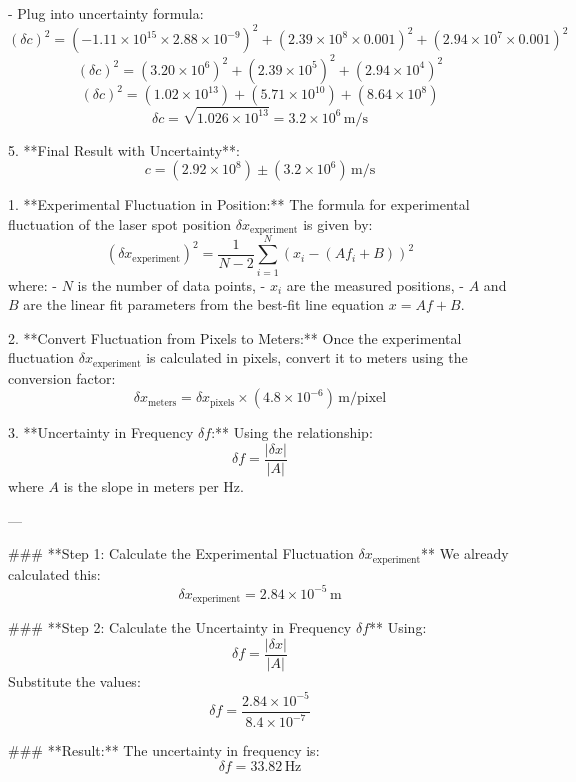      - Plug into uncertainty formula:
       \[
       (\delta c)^2 = \left( -1.11 \times 10^{15} \times 2.88 \times 10^{-9} \right)^2 + \left( 2.39 \times 10^{8} \times 0.001 \right)^2 + \left( 2.94 \times 10^{7} \times 0.001 \right)^2
       \]
       \[
       (\delta c)^2 = (3.20 \times 10^{6})^2 + (2.39 \times 10^{5})^2 + (2.94 \times 10^{4})^2
       \]
       \[
       (\delta c)^2 = (1.02 \times 10^{13}) + (5.71 \times 10^{10}) + (8.64 \times 10^{8})
       \]
       \[
       \delta c = \sqrt{1.026 \times 10^{13}} = 3.2 \times 10^{6} \, \text{m/s}
       \]

5. **Final Result with Uncertainty**:
   \[
   c = (2.92 \times 10^{8}) \pm (3.2 \times 10^{6}) \, \text{m/s}
   \]


1. **Experimental Fluctuation in Position:**
   The formula for experimental fluctuation of the laser spot position \( \delta x_{\text{experiment}} \) is given by:
   \[
   (\delta x_{\text{experiment}})^2 = \frac{1}{N - 2} \sum_{i=1}^{N} (x_i - (A f_i + B))^2
   \]
   where:
   - \( N \) is the number of data points,
   - \( x_i \) are the measured positions,
   - \( A \) and \( B \) are the linear fit parameters from the best-fit line equation \( x = A f + B \).

2. **Convert Fluctuation from Pixels to Meters:**
   Once the experimental fluctuation \( \delta x_{\text{experiment}} \) is calculated in pixels, convert it to meters using the conversion factor:
   \[
   \delta x_{\text{meters}} = \delta x_{\text{pixels}} \times (4.8 \times 10^{-6}) \, \text{m/pixel}
   \]

3. **Uncertainty in Frequency \( \delta f \):**
   Using the relationship:
   \[
   \delta f = \frac{|\delta x|}{|A|}
   \]
   where \( A \) is the slope in meters per Hz.

---

### **Step 1: Calculate the Experimental Fluctuation \( \delta x_{\text{experiment}} \)**
We already calculated this:
\[
\delta x_{\text{experiment}} = 2.84 \times 10^{-5} \, \text{m}
\]

### **Step 2: Calculate the Uncertainty in Frequency \( \delta f \)**
Using:
\[
\delta f = \frac{|\delta x|}{|A|}
\]
Substitute the values:
\[
\delta f = \frac{2.84 \times 10^{-5}}{8.4 \times 10^{-7}}
\]

### **Result:**
The uncertainty in frequency is:
\[
\delta f = 33.82 \, \text{Hz}
\]
